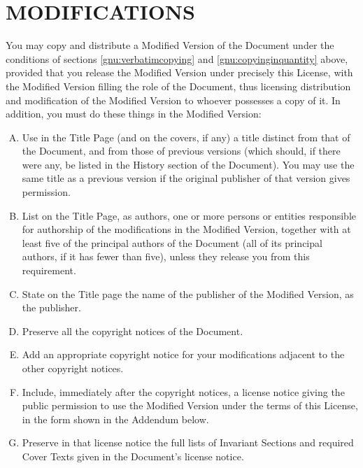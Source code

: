 \section{MODIFICATIONS}
\label{gnu:modifications}
You may copy and distribute a Modified Version of the Document
under the conditions of sections \ref{gnu:verbatimcopying} and 
\ref{gnu:copyinginquantity} above, provided that
you release the Modified Version under precisely this License,
with the Modified Version filling the role of the Document,
thus licensing distribution and modification of the Modified
Version to whoever possesses a copy of it. In addition,
you must do these things in the Modified Version:
\begin{enumerate}[A.]
\item    Use in the Title Page (and on the covers, if any)
a title distinct from that of the Document, and from those of
previous versions (which should, if there were any, be listed
in the History section of the Document). You may use the same
title as a previous version if the original publisher of that
version gives permission.

\item    List on the Title Page, as authors, one or more
persons or entities responsible for authorship of the
modifications in the Modified Version, together with at least
five of the principal authors of the Document (all of its
principal authors, if it has fewer than five), unless they
release you from this requirement.

\item    State on the Title page the name of the publisher of the Modified Version, as the publisher.

\item    Preserve all the copyright notices of the Document.

\item    Add an appropriate copyright notice for your
modifications adjacent to the other copyright notices.

\item    Include, immediately after the copyright notices,
a license notice giving the public permission to use the
Modified Version under the terms of this License, in the form
shown in the Addendum below.

\item    Preserve in that license notice the full lists of
Invariant Sections and required Cover Texts given in the
Document\textquoteright s license notice.


\end{enumerate}
